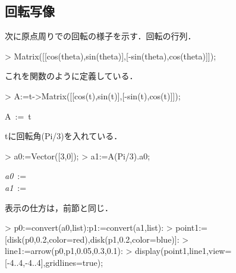 \subsection{回転写像}
次に原点周りでの回転の様子を示す．回転の行列．
\begin{MapleInput}
> Matrix([[cos(theta),sin(theta)],[-sin(theta),cos(theta)]]);
\end{MapleInput}
\begin{MapleOutput}
\end{MapleOutput}
これを関数のように定義している．
\begin{MapleInput}
> A:=t->Matrix([[cos(t),sin(t)],[-sin(t),cos(t)]]);
\end{MapleInput}
\begin{MapleOutput}
A\, := \,t\mapsto  {}
\end{MapleOutput}
tに回転角(Pi/3)を入れている．
\begin{MapleInput}
> a0:=Vector([3,0]);
> a1:=A(Pi/3).a0;
\end{MapleInput}
\begin{MapleOutputGather}
{\it a0}\, := \, \left[ \begin {array}{c} 3\\ 0\end {array} \right] \notag \\
{\it a1}\, := \,  \notag
\end{MapleOutputGather}
表示の仕方は，前節と同じ．
\begin{MapleInput}
> p0:=convert(a0,list):p1:=convert(a1,list):
> point1:=[disk(p0,0.2,color=red),disk(p1,0.2,color=blue)]:
> line1:=arrow(p0,p1,0.05,0.3,0.1):
> display(point1,line1,view=[-4..4,-4..4],gridlines=true);
\end{MapleInput}

